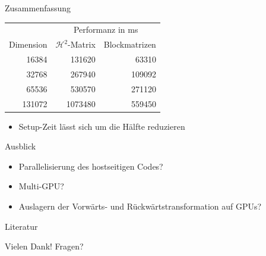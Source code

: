 \documentclass[10pt]{beamer}
\begin{document}
\begin{frame}{Zusammenfassung}
  \small
  \begin{table}
    \begin{tabular}{rrr} \toprule
                & \multicolumn{2}{c}{Performanz in ms} \\ \cmidrule{2-3}
      Dimension & \(\mathcal{H}^2\)-Matrix & Blockmatrizen \\ \midrule
          16384 &                   131620 &   63310 \\
          32768 &                   267940 &  109092 \\
          65536 &                   530570 &  271120 \\
         131072 &                  1073480 &  559450 \\ \bottomrule
      \end{tabular}
    \end{table}
  \normalsize
  \begin{itemize}
    \item Setup-Zeit lässt sich um die Hälfte reduzieren
  \end{itemize}
\end{frame}

\begin{frame}{Ausblick}
  \begin{itemize}
    \item Parallelisierung des hostseitigen Codes?
    \item Multi-GPU\@?
    \item Auslagern der Vorwärts- und Rückwärtstransformation auf GPUs?
  \end{itemize}
\end{frame}
\begin{frame}[allowframebreaks]{Literatur}

  
  
  \nocite{*}

\end{frame}

\begin{frame}
  \Huge Vielen Dank! Fragen?
\end{frame}
\end{document}
